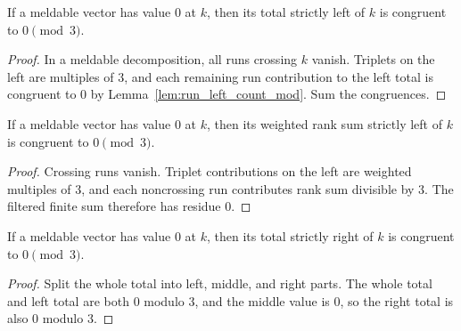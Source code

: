 \begin{lemma}

  \label{lem:meldable_left_total_mod_zero}
  If a meldable vector has value \(0\) at \(k\), then its total strictly
  left of \(k\) is congruent to \(0\pmod3\).
\end{lemma}
\begin{proof}

\leanok
  In a meldable decomposition, all runs crossing \(k\) vanish.  Triplets
  on the left are multiples of \(3\), and each remaining run contribution
  to the left total is congruent to \(0\) by
  Lemma~\ref{lem:run_left_count_mod}.  Sum the congruences.
\end{proof}

\begin{lemma}

  \label{lem:meldable_left_rank_mod_zero}
  If a meldable vector has value \(0\) at \(k\), then its weighted rank
  sum strictly left of \(k\) is congruent to \(0\pmod3\).
\end{lemma}
\begin{proof}

\leanok
  Crossing runs vanish.  Triplet contributions on the left are weighted
  multiples of \(3\), and each noncrossing run contributes rank sum
  divisible by \(3\).  The filtered finite sum therefore has residue
  \(0\).
\end{proof}

\begin{lemma}

  \label{lem:meldable_right_total_mod_zero}
  If a meldable vector has value \(0\) at \(k\), then its total strictly
  right of \(k\) is congruent to \(0\pmod3\).
\end{lemma}
\begin{proof}

\leanok
  Split the whole total into left, middle, and right parts.  The whole
  total and left total are both \(0\) modulo \(3\), and the middle value
  is \(0\), so the right total is also \(0\) modulo \(3\).
\end{proof}

